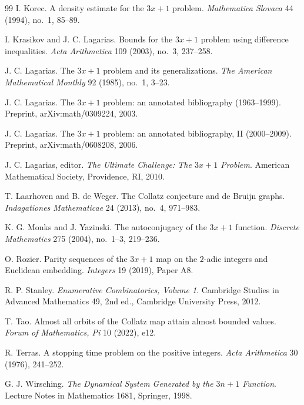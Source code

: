 \documentclass[11pt]{amsart}
\theoremstyle{definition}
\theoremstyle{remark}
\begin{document}
\begin{thebibliography}{99}
I. Korec.
A density estimate for the $3x+1$ problem.
\emph{Mathematica Slovaca} 44 (1994), no.~1, 85--89.

I. Krasikov and J. C. Lagarias.
Bounds for the $3x+1$ problem using difference inequalities.
\emph{Acta Arithmetica} 109 (2003), no.~3, 237--258.

J. C. Lagarias.
The $3x+1$ problem and its generalizations.
\emph{The American Mathematical Monthly} 92 (1985), no.~1, 3--23.

J. C. Lagarias.
The $3x+1$ problem: an annotated bibliography (1963--1999).
Preprint, arXiv:math/0309224, 2003.

J. C. Lagarias.
The $3x+1$ problem: an annotated bibliography, II (2000--2009).
Preprint, arXiv:math/0608208, 2006.

J. C. Lagarias, editor.
\emph{The Ultimate Challenge: The $3x+1$ Problem}.
American Mathematical Society, Providence, RI, 2010.

T. Laarhoven and B. de Weger.
The Collatz conjecture and de Bruijn graphs.
\emph{Indagationes Mathematicae} 24 (2013), no.~4, 971--983.

K. G. Monks and J. Yazinski.
The autoconjugacy of the $3x+1$ function.
\emph{Discrete Mathematics} 275 (2004), no.~1--3, 219--236.

O. Rozier.
Parity sequences of the $3x+1$ map on the $2$-adic integers and Euclidean embedding.
\emph{Integers} 19 (2019), Paper A8.

R. P. Stanley.
\emph{Enumerative Combinatorics, Volume 1}.
Cambridge Studies in Advanced Mathematics 49, 2nd ed., Cambridge University Press, 2012.

T. Tao.
Almost all orbits of the Collatz map attain almost bounded values.
\emph{Forum of Mathematics, Pi} 10 (2022), e12.

R. Terras.
A stopping time problem on the positive integers.
\emph{Acta Arithmetica} 30 (1976), 241--252.

G. J. Wirsching.
\emph{The Dynamical System Generated by the $3n+1$ Function}.
Lecture Notes in Mathematics 1681, Springer, 1998.

\end{thebibliography}
\end{document}
